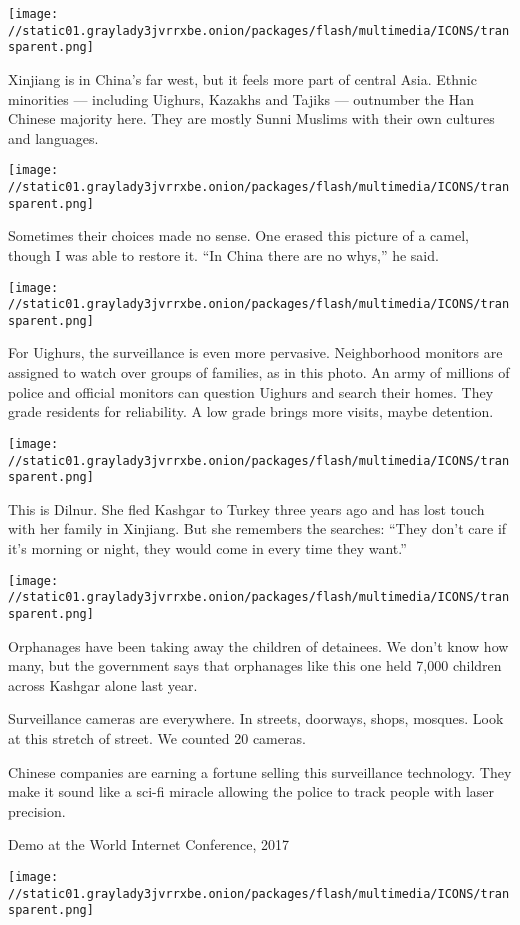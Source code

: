 \texttt{[image: //static01.graylady3jvrrxbe.onion/packages/flash/multimedia/ICONS/transparent.png]}

Xinjiang is in China's far west, but it feels more part of central Asia.
Ethnic minorities --- including Uighurs, Kazakhs and Tajiks ---
outnumber the Han Chinese majority here. They are mostly Sunni Muslims
with their own cultures and languages.

\texttt{[image: //static01.graylady3jvrrxbe.onion/packages/flash/multimedia/ICONS/transparent.png]}

Sometimes their choices made no sense. One erased this picture of a
camel, though I was able to restore it. ``In China there are no whys,''
he said.

\texttt{[image: //static01.graylady3jvrrxbe.onion/packages/flash/multimedia/ICONS/transparent.png]}

For Uighurs, the surveillance is even more pervasive. Neighborhood
monitors are assigned to watch over groups of families, as in this
photo. An army of millions of police and official monitors can question
Uighurs and search their homes. They grade residents for reliability. A
low grade brings more visits, maybe detention.

\texttt{[image: //static01.graylady3jvrrxbe.onion/packages/flash/multimedia/ICONS/transparent.png]}

This is Dilnur. She fled Kashgar to Turkey three years ago and has lost
touch with her family in Xinjiang. But she remembers the searches:
``They don't care if it's morning or night, they would come in every
time they want.''

\texttt{[image: //static01.graylady3jvrrxbe.onion/packages/flash/multimedia/ICONS/transparent.png]}

Orphanages have been taking away the children of detainees. We don't
know how many, but the government says that orphanages like this one
held 7,000 children across Kashgar alone last year.

Surveillance cameras are everywhere. In streets, doorways, shops,
mosques. Look at this stretch of street. We counted 20 cameras.

Chinese companies are earning a fortune selling this surveillance
technology. They make it sound like a sci-fi miracle allowing the police
to track people with laser precision.

Demo at the World Internet Conference, 2017

\texttt{[image: //static01.graylady3jvrrxbe.onion/packages/flash/multimedia/ICONS/transparent.png]}

